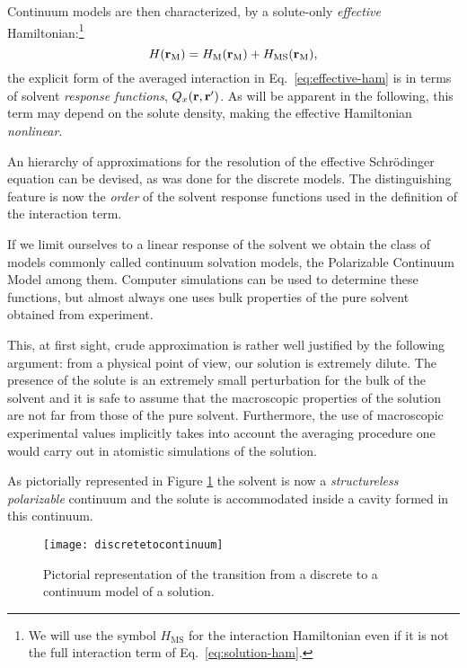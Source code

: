 Continuum models are then characterized, by a solute-only
\emph{effective} Hamiltonian:\footnote{We will use the symbol
$H_\mathrm{MS}$ for the interaction Hamiltonian even if it is not the
full interaction term of Eq.~\eqref{eq:solution-ham}.}
\begin{equation}\label{eq:effective-ham}
 H(\mathbf{r}_\mathrm{M}) = H_\mathrm{M}(\mathbf{r}_\mathrm{M})
+ H_\mathrm{MS}(\mathbf{r}_\mathrm{M}),
\end{equation}
the explicit form of the averaged interaction in
Eq.~\eqref{eq:effective-ham} is in terms of solvent \emph{response
functions}, $Q_x(\mathbf{r},\mathbf{r}^\prime)$.
As will be apparent in the following, this term may depend on the solute
density, making the effective Hamiltonian \emph{nonlinear}.

An hierarchy of approximations for the resolution of the effective
Schr\"odinger equation can be devised, as was done for the discrete
models. The distinguishing feature is now the \emph{order} of the
solvent response functions used in the definition of the interaction
term.

If we limit ourselves to a linear response of the solvent we obtain the
class of models commonly called continuum solvation models, the
Polarizable Continuum Model among them. Computer simulations can be used
to determine these functions, but almost always one uses bulk properties
of the pure solvent obtained from experiment.

This, at first sight, crude approximation is rather well justified by
the following argument: from a physical point of view, our solution is
extremely dilute. The presence of the solute is an extremely small
perturbation for the bulk of the solvent and it is safe to assume that
the macroscopic properties of the solution are not far from those of the
pure solvent. Furthermore, the use of macroscopic experimental values
implicitly takes into account the averaging procedure one would carry
out in atomistic simulations of the solution.

As pictorially represented in Figure \ref{fig:discretetocontinuum} the
solvent is now a \emph{structureless polarizable} continuum and the
solute is accommodated inside a cavity formed in this continuum.
\begin{figure}[!h]
 \centering
\texttt{[image: discretetocontinuum]}
\caption{Pictorial representation of the transition from a discrete to a
continuum model of a solution.}
\label{fig:discretetocontinuum}
\end{figure}

